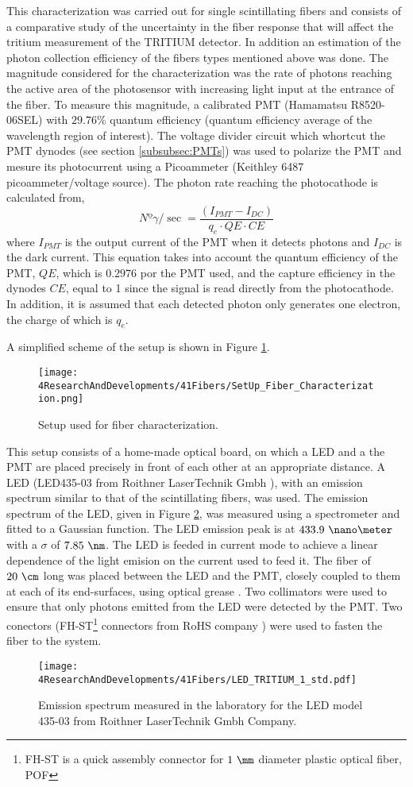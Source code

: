 This characterization was carried out for single scintillating fibers and consists of a comparative study of the uncertainty in the fiber response that will affect the tritium measurement of the TRITIUM detector. In addition an estimation of the photon collection efficiency of the fibers types mentioned above was done. The magnitude considered for the characterization was the rate of photons reaching the active area of the photosensor with increasing light input at the entrance of the fiber. To measure this magnitude, a calibrated PMT (Hamamatsu R8520-06SEL) with $29.76\%$ quantum efficiency (quantum efficiency average of the wavelength region of interest). The voltage divider circuit which whortcut the PMT dynodes (see section \ref{subsubsec:PMTs}) was used to polarize the PMT  and mesure its photocurrent using a Picoammeter (Keithley 6487 picoammeter/voltage source). The photon rate reaching the photocathode is calculated from,
\begin{equation}
Nº\gamma/\sec = \frac{\left( I_{PMT} - I_{DC} \right)}{q_e \cdot{} QE \cdot{} CE}
\label{eq:NumPhotonsFromIntensityPMT}
\end{equation}
where $I_{PMT}$ is the output current of the PMT when it detects photons and $I_{DC}$ is the dark current. This equation takes into account the quantum efficiency of the PMT, $QE$, which is $0.2976$ por the PMT used, and the capture efficiency in the dynodes $CE$, equal to 1 since the signal is read directly from the photocathode. In addition, it is assumed that each detected photon only generates one electron, the charge of which is $q_e$. 

A simplified scheme of the setup is shown in Figure \ref{fig:SetUpFiberCharacterization}.

\begin{figure}[h]
\centering
\texttt{[image: 4ResearchAndDevelopments/41Fibers/SetUp\_Fiber\_Characterization.png]}
\caption{Setup used for fiber characterization.\label{fig:SetUpFiberCharacterization}}
\end{figure}

This setup consists of a home-made optical board, on which a LED and a the PMT are placed precisely in front of each other at an appropriate distance. A LED (LED435-03 from Roithner LaserTechnik Gmbh \cite{LEDRLT}), with an emission spectrum similar to that of the scintillating fibers, was used. The emission spectrum of the LED, given in Figure \ref{fig:LEDSpectrumTritium}, was measured using a spectrometer and fitted to a Gaussian function. The LED emission peak is at $433.9~\nano\meter$ with a $\sigma$ of $7.85~\nm$. The LED is feeded in current mode to achieve a linear dependence of the light emision on the current used to feed it. The fiber of $20~\cm$ long was placed between the LED and the PMT, closely coupled to them at each of its end-surfaces, using optical grease \cite{OpticalGrease}. Two collimators were used to ensure that only photons emitted from the LED were detected by the PMT. Two conectors (FH-ST\footnote{FH-ST is a quick assembly connector for $1~\mm$ diameter plastic optical fiber, POF} connectors from RoHS company \cite{}) were used to fasten the fiber to the system. 

\begin{figure}[h]
\centering
\texttt{[image: 4ResearchAndDevelopments/41Fibers/LED\_TRITIUM\_1\_std.pdf]}
\caption{Emission spectrum measured in the laboratory for the LED model 435-03 from Roithner LaserTechnik Gmbh Company.\label{fig:LEDSpectrumTritium}}
\end{figure}